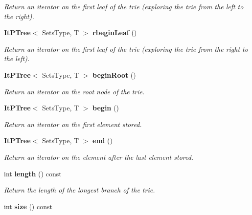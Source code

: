 \begin{CompactItemize}
\begin{CompactList}\small\item\em Return an iterator on the first leaf of the trie (exploring the trie from the left to the right). \item\end{CompactList}\item 
{\bf It\-PTree}$<$ Sets\-Type, T $>$ {\bf rbegin\-Leaf} ()\label{class_p_tree_61ab00242ada00f83f6210efa337e065}

\begin{CompactList}\small\item\em Return an iterator on the first leaf of the trie (exploring the trie from the right to the left). \item\end{CompactList}\item 
{\bf It\-PTree}$<$ Sets\-Type, T $>$ {\bf begin\-Root} ()\label{class_p_tree_7a13989068c070cd0c63517859aff760}

\begin{CompactList}\small\item\em Return an iterator on the root node of the trie. \item\end{CompactList}\item 
{\bf It\-PTree}$<$ Sets\-Type, T $>$ {\bf begin} ()\label{class_p_tree_3b8dac8ae570e9194aeece6fb1de32a2}

\begin{CompactList}\small\item\em Return an iterator on the first element stored. \item\end{CompactList}\item 
{\bf It\-PTree}$<$ Sets\-Type, T $>$ {\bf end} ()\label{class_p_tree_4bed11f5f1b7c6a8821cb962cf174751}

\begin{CompactList}\small\item\em Return an iterator on the element after the last element stored. \item\end{CompactList}\item 
int {\bf length} () const \label{class_p_tree_c2ac4b383a5a842b40a397dd5396bab6}

\begin{CompactList}\small\item\em Return the length of the longest branch of the trie. \item\end{CompactList}\item 
int {\bf size} () const \label{class_p_tree_d9a7994ba4a4eafdd56ad2a2ed2016e1}


\end{CompactItemize}
